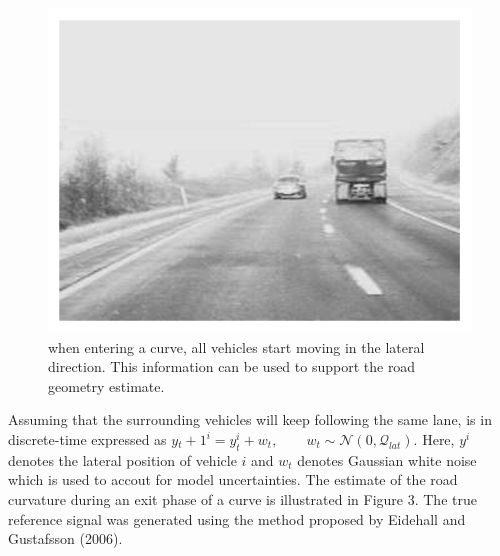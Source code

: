 \documentclass[11pt,oneside,a4paper]{article}
\begin{document}
\begin{figure}[H]
  \begin{center}
  \includegraphics[height=0.3\textheight]{./source/2.png}
  \caption{when entering a curve, all vehicles start moving in the lateral direction. This information
  can be used to support the road geometry estimate.}
  \label{}
  \end{center}
\end{figure}

Assuming that the surrounding vehicles will keep following the same lane, is in discrete-time expressed as
$y{_t+1}^i = y_{t}^i + w_t,\qquad w_t \sim \mathcal{N}(0, \mathcal{Q}_{lat}). $ Here, $y^i $ denotes the lateral
position of vehicle $i $ and $w_t $ denotes Gaussian white noise which is used to accout for model uncertainties.
The estimate of the road curvature during an exit phase of a curve is illustrated in Figure 3. The true reference
signal was generated using the method proposed by Eidehall and Gustafsson (2006).
\end{document}
